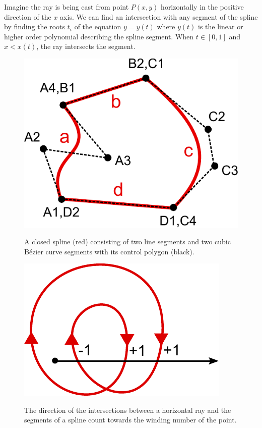 \documentclass[11pt,a4paper,twoside]{article}
\begin{document}
Imagine the ray is being cast from point $P(x,y)$ horizontally in the positive direction of the $x$ axis. We can find an intersection with any segment of the spline by finding the roots $t_i$ of the equation $y = y(t)$ where $y(t)$ is the linear or higher order polynomial describing the spline segment. When $t \in [0,1]$ and $x < x(t)$, the ray intersects the segment.

\begin {figure}
\centering
\begin {minipage}[b]{0.45\linewidth}
	\centering
	\includegraphics [width=0.8\columnwidth]{figures/spline}
	\caption {A closed spline (red) consisting of two line segments and two cubic B\'{e}zier curve segments with its control polygon (black).}
	\label {fig:spline}
\end {minipage}
\hspace{0.5cm}
\begin {minipage}[b]{0.45\linewidth}
	\centering
	\includegraphics [width=0.8\columnwidth]{figures/ray}
	\caption {The direction of the intersections between a horizontal ray and the segments of a spline count towards the winding number of the point.}
	\label {fig:ray}
\end {minipage}
\end {figure}
\end{document}
